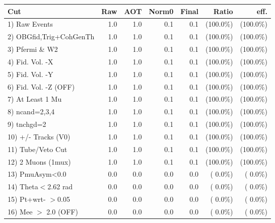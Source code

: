  \begin{table}[h!]\centering
 \begin{tabular}{||l||r|r|r|r|r|r||}
 \hline
 \hline
 Cut & Raw & AOT & Norm0 & Final & Ratio & eff.       \\
 \hline
  1) Raw Events           &          1.0 &          1.0 &          0.1 &          0.1 & (100.0\%) & (100.0\%) \\
  2) OBGfid,Trig+CohGenTh &          1.0 &          1.0 &          0.1 &          0.1 & (100.0\%) & (100.0\%) \\
  3) Pfermi \& W2         &          1.0 &          1.0 &          0.1 &          0.1 & (100.0\%) & (100.0\%) \\
  4) Fid. Vol. -X         &          1.0 &          1.0 &          0.1 &          0.1 & (100.0\%) & (100.0\%) \\
  5) Fid. Vol. -Y         &          1.0 &          1.0 &          0.1 &          0.1 & (100.0\%) & (100.0\%) \\
  6) Fid. Vol. -Z (OFF)   &          1.0 &          1.0 &          0.1 &          0.1 & (100.0\%) & (100.0\%) \\
  7) At Least 1 Mu        &          1.0 &          1.0 &          0.1 &          0.1 & (100.0\%) & (100.0\%) \\
  8) ncand=2,3,4          &          1.0 &          1.0 &          0.1 &          0.1 & (100.0\%) & (100.0\%) \\
  9) tnchgd=2             &          1.0 &          1.0 &          0.1 &          0.1 & (100.0\%) & (100.0\%) \\
 10) +/- Tracks (V0)      &          1.0 &          1.0 &          0.1 &          0.1 & (100.0\%) & (100.0\%) \\
 11) Tube/Veto Cut        &          1.0 &          1.0 &          0.1 &          0.1 & (100.0\%) & (100.0\%) \\
 12) 2 Muons (1mux)       &          1.0 &          1.0 &          0.1 &          0.1 & (100.0\%) & (100.0\%) \\
 13) PmuAsym<0.0          &          0.0 &          0.0 &          0.0 &          0.0 & (  0.0\%) & (  0.0\%) \\
 14) Theta$<$2.62 rad     &          0.0 &          0.0 &          0.0 &          0.0 & (  0.0\%) & (  0.0\%) \\
 15) Pt+wrt- $>$0.05      &          0.0 &          0.0 &          0.0 &          0.0 & (  0.0\%) & (  0.0\%) \\
 16) Mee $>$ 2.0  (OFF)   &          0.0 &          0.0 &          0.0 &          0.0 & (  0.0\%) & (  0.0\%) \\

\end{tabular}
\end{table}
